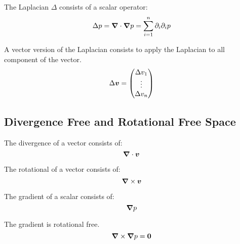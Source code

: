 \begin{definition}[Laplacian]
The Laplacian $\Delta$ consists of a scalar operator:
\begin{equation}
\Delta p={\boldsymbol {\nabla}}\cdot {\boldsymbol {\nabla}}p=\sum_{i=1}^{n} \partial_{i}\partial_{i}p
\end{equation}
\end{definition}

\begin{definition}
A vector version of the Laplacian consists to apply the Laplacian to all component of the vector.
\begin{equation}
 \Delta {\boldsymbol {v}}=\begin{pmatrix} \Delta v_{1}\\
                  \vdots\\ \Delta v_{n}
                 \end{pmatrix}
\end{equation}
\end{definition}
\subsection{Divergence Free and Rotational Free Space}

\begin{definition}[Divergence]
 The divergence of a vector consists of:
 \begin{equation}
  {\boldsymbol {\nabla}} \cdot {\boldsymbol {v}}
  \end{equation}
\end{definition}

\begin{definition}[Rotational]
 The rotational of a vector consists of:
 \begin{equation}
  {\boldsymbol {\nabla}} \times {\boldsymbol {v}}
 \end{equation}
\end{definition}

\begin{definition}[Gradient]
 The gradient of a scalar consists of:
 \begin{equation}
  {\boldsymbol {\nabla}} p
 \end{equation}
\end{definition}

\begin{property}
 The gradient is rotational free.
 \begin{equation}
  {\boldsymbol {\nabla}}\times {\boldsymbol {\nabla}} p={\boldsymbol {0}}
 \end{equation}
\end{property}

